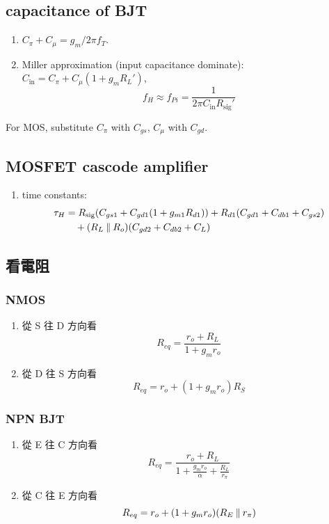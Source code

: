 \documentclass[12pt, a4paper]{article}
\begin{document}
\subsection{capacitance of BJT}
\begin{enumerate}
  \item $C_\pi + C_\mu = g_m / 2\pi f_T$.
  \item Miller approximation (input capacitance dominate):
    $C_\text{in} = C_\pi + C_\mu(1 + g_mR_L')$,
    \[ f_H \approx f_{Pi} = \frac{1}{2\pi C_\text{in} R_\text{sig}'} \]
\end{enumerate}
For MOS, substitute $C_\pi$ with $C_{gs}$, $C_\mu$ with $C_{gd}$.
\subsection{MOSFET cascode amplifier}
\begin{enumerate}
  \item time constants:
    \begin{align*}
      \tau_{H} &= R_\text{sig} (C_{gs1} + C_{gd1}(1+g_{m1}R_{d1}))
      + R_{d1}(C_{gd1} + C_{db1} + C_{gs2}) \\
      & \quad + (R_L \mathbin{\|} R_o) (C_{gd2} + C_{db2} + C_L)
    \end{align*}
\end{enumerate}
\subsection{看電阻}
\subsubsection{NMOS}
\begin{enumerate}
  \item 從 S 往 D 方向看 
    \[ R_{eq} = \frac{r_o + R_L}{1+g_mr_o} \]
  \item 從 D 往 S 方向看 
    \[ R_{eq} = r_o + (1 + g_m r_o) R_S \]
\end{enumerate}
\subsubsection{NPN BJT}
\begin{enumerate}
  \item 從 E 往 C 方向看 
    \[ R_{eq} = \frac{r_o + R_L}{1+\frac{g_mr_o}{\alpha} + \frac{R_L}{r_\pi}} \]
  \item 從 C 往 E 方向看 
    \[ R_{eq} = r_o + (1 + g_mr_o) (R_E \mathbin{\|} r_\pi) \]
\end{enumerate}
\end{document}
